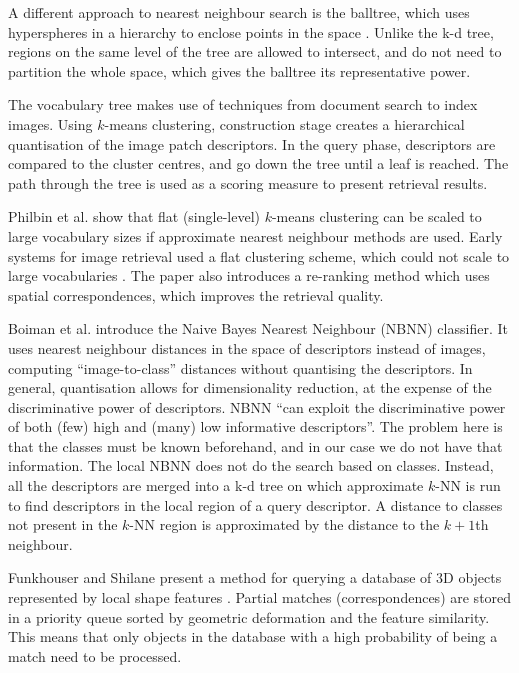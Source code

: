 \documentclass[11pt,a4paper]{kth-mag}
\begin{document}
A different approach to nearest neighbour search is the balltree, which uses
hyperspheres in a hierarchy to enclose points in the space
\cite{omohundro1989five}. Unlike the k-d tree, regions on the same level of the
tree are allowed to intersect, and do not need to partition the whole space,
which gives the balltree its representative power.

The vocabulary tree \cite{nister2006scalable} makes use of techniques from
document search to index images. Using $k$-means clustering, construction stage
creates a hierarchical quantisation of the image patch descriptors. In the query
phase, descriptors are compared to the cluster centres, and go down the tree
until a leaf is reached. The path through the tree is used as a scoring measure
to present retrieval results.

Philbin et al. \cite{philbin2007object} show that flat (single-level) $k$-means
clustering can be scaled to large vocabulary sizes if approximate nearest
neighbour methods are used. Early systems for image retrieval used a flat
clustering scheme, which could not scale to large vocabularies
\cite{sivic2003video}. The paper also introduces a re-ranking method which uses
spatial correspondences, which improves the retrieval quality.

Boiman et al. \cite{boiman2008defense} introduce the Naive Bayes Nearest
Neighbour (NBNN) classifier. It uses nearest neighbour distances in the space of
descriptors instead of images, computing ``image-to-class'' distances without
quantising the descriptors. In general, quantisation allows for dimensionality
reduction, at the expense of the discriminative power of descriptors. NBNN ``can
exploit the discriminative power of both (few) high and (many) low informative
descriptors''. The problem here is that the classes must be known beforehand,
and in our case we do not have that information. The local NBNN
\cite{mccann2012local} does not do the search based on classes. Instead, all the
descriptors are merged into a k-d tree on which approximate $k$-NN is run to
find descriptors in the local region of a query descriptor. A distance to
classes not present in the $k$-NN region is approximated by the distance to the
$k+1$th neighbour.

Funkhouser and Shilane present a method for querying a database of 3D objects
represented by local shape features \cite{funkhouser2006partial}. Partial
matches (correspondences) are stored in a priority queue sorted by geometric
deformation and the feature similarity. This means that only objects in the
database with a high probability of being a match need to be processed.
\end{document}
